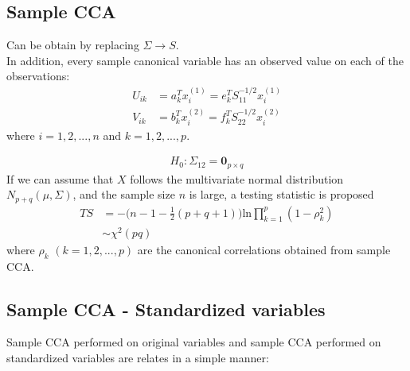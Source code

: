 \documentclass[12pt]{extarticle}
\newcommand{\<}{\langle}
\renewcommand{\>}{\rangle}
\theoremstyle{definition}
\begin{document}
\subsection{Sample CCA}
Can be obtain by replacing $\Sigma \rightarrow S$.\\

In addition, every sample canonical variable has an observed value on each of the observations:
\begin{align*}
    U_{ik} &= a_k^T x_i^{(1)} = e_k^T S_{11}^{-1/2} x_i^{(1)}\\
    V_{ik} &= b_k^T x_i^{(2)} = f_k^T S_{22}^{-1/2} x_i^{(2)}
\end{align*}
where $i=1,2,...,n$ and $k=1,2,...,p$.\\

\begin{tcolorbox}[enhanced, drop fuzzy shadow, title=Test for $\Sigma_{12}$ (Not required)]
\begin{align*}
    H_0: \Sigma_{12} = \textbf{0}_{p\times q}
\end{align*}
If we can assume that $X$ follows the multivariate normal distribution $N_{p+q}(\mu,\Sigma)$, and the sample size $n$ is large, a testing statistic is proposed
\begin{align*}
    TS&=-\bigg(n-1-\frac{1}{2}(p+q+1) \bigg)\text{ln}\prod^p_{k=1}(1-\rho_k^2)\\
    &\sim \chi^2(pq)
\end{align*}
where $\rho_k$ $(k=1,2,...,p)$ are the canonical correlations obtained from sample CCA.
\end{tcolorbox}

\newpage
\subsection{Sample CCA - Standardized variables}
Sample CCA performed on original variables and sample CCA performed on standardized variables are relates in a simple manner:
\end{document}
